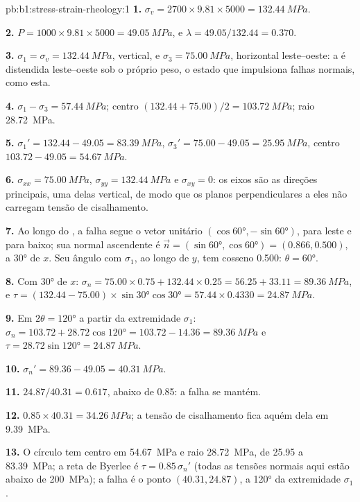 \begin{solution}{pb:b1:stress-strain-rheology:1}
\textbf{1.} $\sigma_v = 2700\times9.81\times5000 = \qty{132.44}{MPa}$.

\textbf{2.} $P = 1000\times9.81\times5000 = \qty{49.05}{MPa}$, e
$\lambda = 49.05/132.44 = 0.370$.

\textbf{3.} $\sigma_1 = \sigma_v = \qty{132.44}{MPa}$, vertical, e
$\sigma_3 = \qty{75.00}{MPa}$, horizontal leste--oeste: a  é distendida leste--oeste sob o próprio peso, o estado que impulsiona falhas normais, como esta.

\textbf{4.} $\sigma_1 - \sigma_3 = \qty{57.44}{MPa}$; centro
$(132.44 + 75.00)/2 = \qty{103.72}{MPa}$; raio \qty{28.72}{MPa}.

\textbf{5.} $\sigma_1' = 132.44 - 49.05 = \qty{83.39}{MPa}$, $\sigma_3' =
75.00 - 49.05 = \qty{25.95}{MPa}$, centro $103.72 - 49.05 = \qty{54.67}{MPa}$.

\textbf{6.} $\sigma_{xx} = \qty{75.00}{MPa}$, $\sigma_{yy} = \qty{132.44}{MPa}$
e $\sigma_{xy} = 0$: os eixos são as direções principais, uma delas
vertical, de modo que os planos perpendiculares a eles não carregam tensão de cisalhamento.

\textbf{7.} Ao longo do , a falha segue o vetor unitário
$(\cos\ang{60}, -\sin\ang{60})$, para leste e para baixo; sua normal ascendente é
$\vec n = (\sin\ang{60}, \cos\ang{60}) = (0.866, 0.500)$, a \ang{30} de
$x$. Seu ângulo com $\sigma_1$, ao longo de $y$, tem cosseno
0.500: $\theta = \ang{60}$.

\textbf{8.} Com \ang{30} de $x$: $\sigma_n = 75.00\times0.75 + 132.44\times0.25
= 56.25 + 33.11 = \qty{89.36}{MPa}$, e $\tau = (132.44 - 75.00)\times
\sin\ang{30}\cos\ang{30} = 57.44\times0.4330 = \qty{24.87}{MPa}$.

\textbf{9.} Em $2\theta = \ang{120}$ a partir da extremidade $\sigma_1$:
$\sigma_n = 103.72 + 28.72\cos\ang{120} = 103.72 - 14.36 = \qty{89.36}{MPa}$
e $\tau = 28.72\sin\ang{120} = \qty{24.87}{MPa}$.

\textbf{10.} $\sigma_n' = 89.36 - 49.05 = \qty{40.31}{MPa}$.

\textbf{11.} $24.87/40.31 = 0.617$, abaixo de 0.85: a falha se mantém.

\textbf{12.} $0.85\times40.31 = \qty{34.26}{MPa}$; a tensão de cisalhamento fica aquém dela em \qty{9.39}{MPa}.

\textbf{13.} O círculo tem centro em \qty{54.67}{MPa} e raio
\qty{28.72}{MPa}, de \num{25.95} a \qty{83.39}{MPa}; a reta de Byerlee é
$\tau = 0.85\,\sigma_n'$ (todas as tensões normais aqui estão abaixo de
\qty{200}{MPa}); a falha é o ponto $(40.31, 24.87)$, a \ang{120} da
extremidade $\sigma_1$.


\end{solution}
